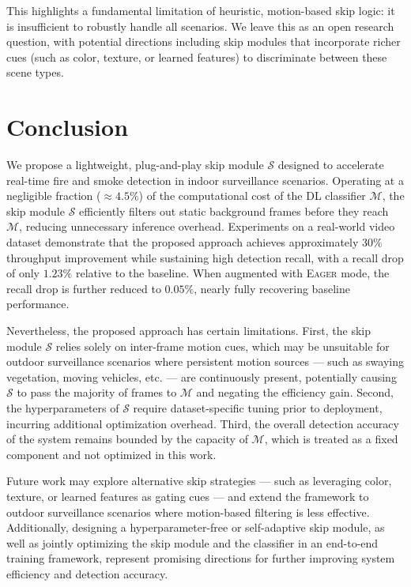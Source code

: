 \documentclass[
  10pt,
]{article}
\begin{document}
This highlights a fundamental limitation of heuristic, motion-based skip
logic: it is insufficient to robustly handle all scenarios. We leave
this as an open research question, with potential directions including
skip modules that incorporate richer cues (such as color, texture, or
learned features) to discriminate between these scene types.

\section{Conclusion}\label{sec:conclusion}

We propose a lightweight, plug-and-play skip module \(\mathcal{S}\)
designed to accelerate real-time fire and smoke detection in indoor
surveillance scenarios. Operating at a negligible fraction
(\({\approx}4.5\%\)) of the computational cost of the DL classifier
\(\mathcal{M}\), the skip module \(\mathcal{S}\) efficiently filters out
static background frames before they reach \(\mathcal{M}\), reducing
unnecessary inference overhead. Experiments on a real-world video
dataset demonstrate that the proposed approach achieves approximately
\(30\%\) throughput improvement while sustaining high detection recall,
with a recall drop of only \(1.23\%\) relative to the baseline. When
augmented with \textsc{Eager} mode, the recall drop is further reduced
to \(0.05\%\), nearly fully recovering baseline performance.

Nevertheless, the proposed approach has certain limitations. First, the
skip module \(\mathcal{S}\) relies solely on inter-frame motion cues,
which may be unsuitable for outdoor surveillance scenarios where
persistent motion sources --- such as swaying vegetation, moving
vehicles, etc. --- are continuously present, potentially causing
\(\mathcal{S}\) to pass the majority of frames to \(\mathcal{M}\) and
negating the efficiency gain. Second, the hyperparameters of
\(\mathcal{S}\) require dataset-specific tuning prior to deployment,
incurring additional optimization overhead. Third, the overall detection
accuracy of the system remains bounded by the capacity of
\(\mathcal{M}\), which is treated as a fixed component and not optimized
in this work.

Future work may explore alternative skip strategies --- such as
leveraging color, texture, or learned features as gating cues --- and
extend the framework to outdoor surveillance scenarios where
motion-based filtering is less effective. Additionally, designing a
hyperparameter-free or self-adaptive skip module, as well as jointly
optimizing the skip module and the classifier in an end-to-end training
framework, represent promising directions for further improving system
efficiency and detection accuracy.
\end{document}
